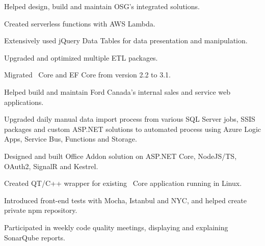\documentclass[letterpaper]{cv_12} %
\begin{document}
\begin{newpage}
\begin{minipage}[t]{0.59\textwidth}
    \sectionspace%



    \begin{tightitemize}
        \item Helped design, build and maintain OSG's integrated solutions.
        \item Created serverless functions with AWS Lambda.
        \item Extensively used jQuery Data Tables for data presentation and
        manipulation.
        \item Upgraded and optimized multiple ETL packages.
        \item Migrated \dotnet\ Core and EF Core from version 2.2 to 3.1.
    \end{tightitemize}

    \sectionspace%



    \begin{tightitemize}
        \item Helped build and maintain Ford Canada's internal sales and
        service web applications.
        \item Upgraded daily manual data import process from various SQL Server
        jobs, SSIS packages and custom ASP.NET solutions to automated process using
        Azure Logic Apps, Service Bus, Functions and Storage.
    \end{tightitemize}

    \sectionspace%



    \begin{tightitemize}
        \item Designed and built Office Addon solution on
        ASP.NET Core, NodeJS/TS, OAuth2, SignalR and Kestrel.
        \item Created QT/C++ wrapper for existing \dotnet\ Core application
        running in Linux.
        \item Introduced front-end tests with Mocha, Istanbul and NYC,
        and helped create private npm repository.
        \item Participated in weekly code quality meetings, displaying
        and explaining SonarQube reports.
    \end{tightitemize}


\end{minipage}
\end{newpage}
\end{document}
